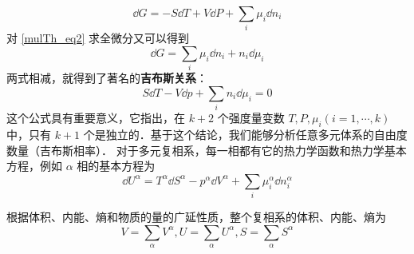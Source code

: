 \begin{equation}\label{mulTh_eq3}
\dd G=-S\dd T+V\dd P+\sum_i\mu_i\dd n_i
\end{equation}
对 \autoref{mulTh_eq2} 求全微分又可以得到
\begin{equation}
\dd G=\sum_i\mu_i\dd n_i+n_i\dd \mu_i
\end{equation}
两式相减，就得到了著名的\textbf{吉布斯关系}：
\begin{equation}
S\dd T-V\dd p+\sum_i n_i\dd \mu_i=0
\end{equation}
这个公式具有重要意义，它指出，在 $k+2$ 个强度量变数 $T,P,\mu_i(i=1,\cdots,k)$ 中，只有 $k+1$ 个是独立的．基于这个结论，我们能够分析任意多元体系的自由度数量（吉布斯相率）．
对于多元复相系，每一相都有它的热力学函数和热力学基本方程，例如 $\alpha$ 相的基本方程为
\begin{equation}
\dd U^\alpha=T^\alpha\dd S^\alpha-p^\alpha\dd V^\alpha+\sum_i\mu_i^\alpha\dd n_i^\alpha
\end{equation}

根据体积、内能、熵和物质的量的广延性质，整个复相系的体积、内能、熵为
\begin{equation}
V=\sum_\alpha V^\alpha,U=\sum_\alpha U^\alpha,S=\sum_\alpha S^\alpha
\end{equation}

